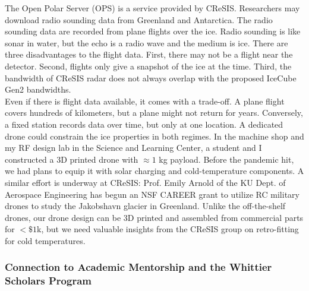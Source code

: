 \documentclass[../../../main.tex]{subfiles}
\begin{document}
The Open Polar Server (OPS) is a service provided by CReSIS.  Researchers may download radio sounding data from Greenland and Antarctica.  The radio sounding data are recorded from plane flights over the ice.  Radio sounding is like sonar in water, but the echo is a radio wave and the medium is ice.  There are three disadvantages to the flight data.  First, there may not be a flight near the detector.  Second, flights only give a snapshot of the ice at the time.  Third, the bandwidth of CReSIS radar does not always overlap with the proposed IceCube Gen2 bandwidths.
\\
\vspace{0.25cm}
Even if there is flight data available, it comes with a trade-off.  A plane flight covers hundreds of kilometers, but a plane might not return for years.  Conversely, a fixed station records data over time, but only at one location.  A dedicated drone could constrain the ice properties in both regimes.  In the machine shop and my RF design lab in the Science and Learning Center, a student and I constructed a 3D printed drone with $\approx 1$ kg payload.  Before the pandemic hit, we had plans to equip it with solar charging and cold-temperature components.  A similar effort is underway at CReSIS: Prof. Emily Arnold of the KU Dept. of Aerospace Engineering has begun an NSF CAREER grant to utilize RC military drones to study the Jakobshavn glacier in Greenland.  Unlike the off-the-shelf drones, our drone design can be 3D printed and assembled from commercial parts for $< \$1$k, but we need valuable insights from the CReSIS group on retro-fitting for cold temperatures.

\subsubsection{Connection to Academic Mentorship and the Whittier Scholars Program}
\end{document}
